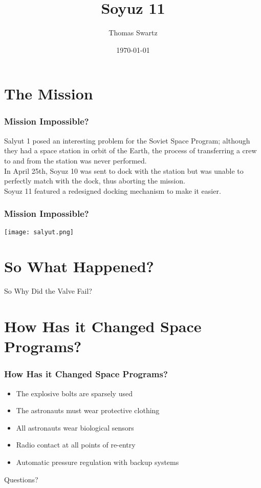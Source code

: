 \documentclass[blue]{beamer}
\title{Soyuz 11}
\author{Thomas Swartz}
\institute{The University of Scranton}
\date{\today}
\begin{document}
\frame{\titlepage}


\section{The Mission}

\begin{frame}
\frametitle{Mission Impossible?}
Salyut 1 posed an interesting problem for the Soviet Space Program; although they had a space station in orbit of the Earth, the process of transferring a crew to and from the station was never performed. \\
In April 25th, Soyuz 10 was sent to dock with the station but was unable to perfectly match with the dock, thus aborting the mission.\\ 
Soyuz 11 featured a redesigned docking mechanism to make it easier.
\end{frame}

\begin{frame}
\frametitle{Mission Impossible?}
\begin{center}
	\texttt{[image: salyut.png]}
\end{center}
\end{frame}

\section{So What Happened?}

\begin{frame}
\begin{center}\huge So Why Did the Valve Fail?
\end{center}
\end{frame}

\section{How Has it Changed Space Programs?}
\begin{frame}
\frametitle{How Has it Changed Space Programs?}
\begin{itemize}
\item<1-> The explosive bolts are sparsely used
\item<2-> The astronauts must wear protective clothing
\item<3-> All astronauts wear biological sensors
\item<4-> Radio contact at all points of re-entry
\item<5-> Automatic pressure regulation with backup systems
\end{itemize}
\end{frame}

\begin{frame}
\begin{center}\huge{Questions?}\end{center}
\end{frame}
\end{document}

